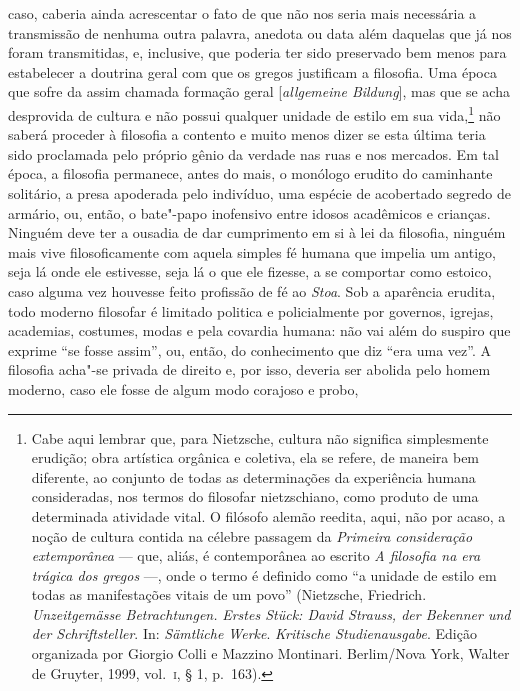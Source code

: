  caso, caberia ainda acrescentar o fato de que não nos seria mais necessária
 a transmissão de nenhuma outra palavra, anedota ou data além daquelas que já
 nos foram transmitidas, e, inclusive, que poderia ter sido preservado bem
 menos para estabelecer a doutrina geral com que os gregos justificam a
 filosofia. Uma época que sofre da assim chamada formação geral [\textit{allgemeine Bildung}], 
 mas que se acha desprovida de cultura e não possui qualquer unidade 
 de estilo em sua vida,\footnote{Cabe aqui lembrar que, para Nietzsche, 
 cultura não significa simplesmente erudição; obra artística orgânica e 
 coletiva, ela se refere, de maneira bem diferente, ao conjunto de
 todas as determinações da experiência humana consideradas, nos termos do
 filosofar nietzschiano, como produto de uma determinada atividade vital. O
 filósofo alemão reedita, aqui, não por acaso, a noção de cultura contida na
 célebre passagem da \textit{Primeira consideração extemporânea} --- que,
 aliás, é contemporânea ao escrito \textit{A filosofia na era trágica dos
 gregos} ---, onde o termo é definido como ``a unidade de estilo em todas as
 manifestações vitais de um povo'' (Nietzsche, Friedrich. \textit{Unzeitgemässe 
 Betrachtungen.} \textit{Erstes Stück: David Strauss, der
 Bekenner und der Schriftsteller}. In: \textit{Sämtliche Werke}. 
 \textit{Kritische Studienausgabe}. Edição organizada por Giorgio Colli e 
 Mazzino Montinari. Berlim/Nova York, Walter de Gruyter, 1999, vol.~\textsc{i}, 
 § 1, p.~163).} não saberá proceder à filosofia a contento e muito menos dizer 
 se esta última teria sido proclamada pelo próprio gênio da verdade nas ruas 
 e nos mercados. Em tal época, a filosofia permanece, antes do mais, o monólogo 
 erudito do caminhante solitário, a presa apoderada pelo indivíduo, uma espécie 
 de acobertado segredo de armário, ou, então, o bate"-papo inofensivo entre idosos 
 acadêmicos e crianças. Ninguém deve ter a ousadia de dar cumprimento em si à lei da
 filosofia, ninguém mais vive filosoficamente com aquela simples fé humana
 que impelia um antigo, seja lá onde ele estivesse, seja lá o que ele
 fizesse, a se comportar como estoico, caso alguma vez houvesse feito
 profissão de fé ao \textit{Stoa}. Sob a aparência erudita, todo moderno
 filosofar é limitado politica e policialmente por governos, igrejas,
 academias, costumes, modas e pela covardia humana: não vai além do suspiro
 que exprime ``se fosse assim'', ou, então, do conhecimento que diz ``era uma
 vez''. A filosofia acha"-se privada de direito e, por isso, deveria ser
 abolida pelo homem moderno, caso ele fosse de algum modo corajoso e probo,

